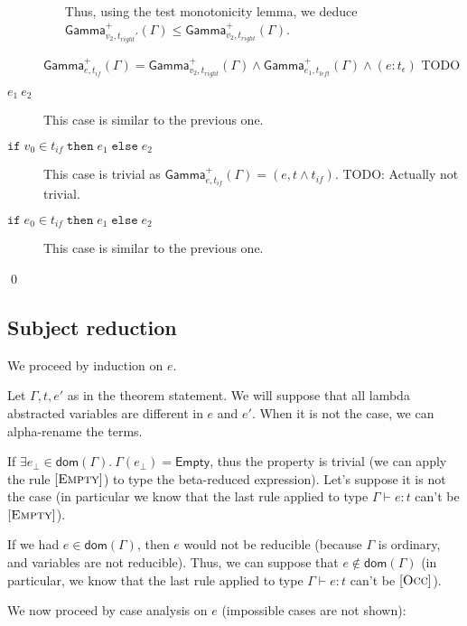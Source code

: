 \documentclass[a4paper]{article}%
\newcommand{\dom}[1]{\textsf{dom}(#1)}
\newcommand{\Empty} {\textsf{Empty}}%
\newcommand{\ite}[4]{\ensuremath{\texttt{if}\;#1\in#2\;\texttt{then}\;#3\;\texttt{else}\;#4}}
\newcommand{\Genv}[3]{\textsf{Gamma}^{#1}_{#2}(#3)}
\theoremstyle{definition}
\newcommand {\Rule}[1] {[\textsc{#1}]}
\begin{document}
\begin{description}
\begin{itemize}
            Thus, using the test monotonicity lemma, we deduce $\Genv + {v_2,t_{right}'} \Gamma \leq \Genv + {v_2,t_{right}} \Gamma$.
          \end{itemize}
          
          $\Genv + {e,t_{if}} \Gamma = \Genv + {v_2,t_{right}} \Gamma \land \Genv + {e_1,t_{left}} \Gamma \land (e:t_\epsilon)$ TODO
    
          \item[$e_1\ e_2$] This case is similar to the previous one.
          \item[$\ite {v_0} {t_{if}} {e_1} {e_2}$] This case is trivial as $\Genv + {e,t_{if}} \Gamma = (e, t\land t_{if})$. TODO: Actually not trivial.
          \item[$\ite {e_0} {t_{if}} {e_1} {e_2}$] This case is similar to the previous one.
        \end{description}
    
        \qed
    
        \subsection{Subject reduction}
    
        We proceed by induction on $e$.
    
        Let $\Gamma,t,e'$ as in the theorem statement.
        We will suppose that all lambda abstracted variables are different in $e$ and $e'$. When it is not the case, we can alpha-rename the terms.
    
        If $\exists e_{\bot} \in \dom\Gamma.\ \Gamma(e_{\bot}) = \Empty$, thus the property is trivial
        (we can apply the rule $\Rule {Empty}$) to type the beta-reduced expression).
        Let's suppose it is not the case (in particular we know that the last rule applied to type $\Gamma \vdash e:t$ can't be $\Rule{Empty}$).
    
        If we had $e\in\dom\Gamma$, then $e$ would not be reducible (because $\Gamma$ is ordinary, and variables are not reducible).
        Thus, we can suppose that $e\not\in\dom\Gamma$ (in particular, we know that the last rule applied to type $\Gamma \vdash e:t$ can't be $\Rule{Occ}$).
    
        We now proceed by case analysis on $e$ (impossible cases are not shown):
    
\end{document}
